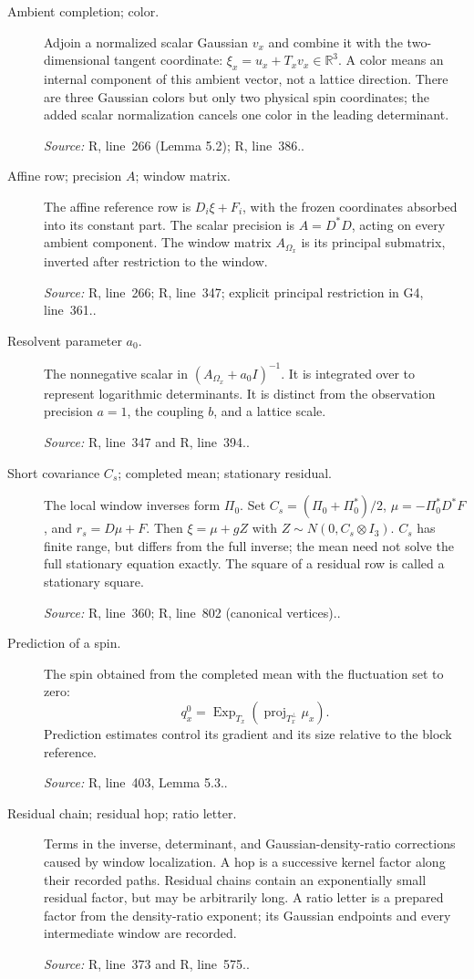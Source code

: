 \documentclass[11pt]{article}
\newcommand{\src}[2]{\textsf{#1}, line~#2}
\newcommand{\where}[1]{\par{\small\textit{Source:} #1.}}
\newcommand{\R}{\mathbb R}
\begin{document}
\begin{description}
\item[Ambient completion; color.]
Adjoin a normalized scalar Gaussian \(v_x\) and combine it with
the two-dimensional tangent coordinate:
\(\xi_x=u_x+T_xv_x\in\R^3\).  A color means an internal component
of this ambient vector, not a lattice direction.  There are three
Gaussian colors but only two physical spin coordinates; the added
scalar normalization cancels one color in the leading determinant.
\where{\src{R}{266} (Lemma 5.2); \src{R}{386}.}

\item[Affine row; precision \(A\); window matrix.]
The affine reference row is \(D_i\xi+F_i\), with the frozen
coordinates absorbed into its constant part.  The scalar precision
is \(A=D^*D\), acting on every ambient component.  The window
matrix \(A_{\Omega_x}\) is its principal submatrix, inverted after
restriction to the window.
\where{\src{R}{266}; \src{R}{347}; explicit principal restriction
in \src{G4}{361}.}

\item[Resolvent parameter \(a_0\).]
The nonnegative scalar in \((A_{\Omega_x}+a_0I)^{-1}\).  It is
integrated over to represent logarithmic determinants.  It is
distinct from the observation precision \(a=1\), the coupling
\(b\), and a lattice scale.
\where{\src{R}{347} and \src{R}{394}.}

\item[Short covariance \(C_s\); completed mean; stationary residual.]
The local window inverses form \(\Pi_0\).  Set
\(C_s=(\Pi_0+\Pi_0^*)/2\),
\(\mu=-\Pi_0^*D^*F\), and \(r_s=D\mu+F\).
Then \(\xi=\mu+gZ\) with \(Z\sim N(0,C_s\otimes I_3)\).
\(C_s\) has finite range, but differs from the full inverse;
the mean need not solve the full stationary equation exactly.
The square of a residual row is called a stationary square.
\where{\src{R}{360}; \src{R}{802} (canonical vertices).}

\item[Prediction of a spin.]
The spin obtained from the completed mean with the fluctuation set
to zero:
\[
q_x^0=\operatorname{Exp}_{T_x}
(\operatorname{proj}_{T_x^\perp}\mu_x).
\]
Prediction estimates control its gradient and its size relative to
the block reference.
\where{\src{R}{403}, Lemma 5.3.}

\item[Residual chain; residual hop; ratio letter.]
Terms in the inverse, determinant, and Gaussian-density-ratio
corrections caused by window localization.  A hop is a successive
kernel factor along their recorded paths.  Residual chains contain
an exponentially small residual factor, but may be arbitrarily long.
A ratio letter is a prepared factor from the density-ratio exponent;
its Gaussian endpoints and every intermediate window are recorded.
\where{\src{R}{373} and \src{R}{575}.}


\end{description}
\end{document}
